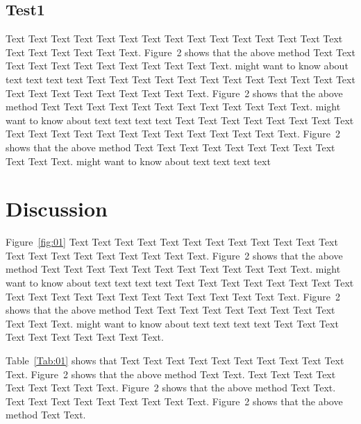 \documentclass{bioinfo}
\begin{document}
\subsection{Test1}

Text Text Text Text Text Text  Text Text Text Text Text Text Text
Text Text  Text Text Text Text Text Text.
Figure~2\vphantom{\ref{fig:02}} shows that the above method  Text
Text Text Text  Text Text Text Text Text Text  Text Text.
\citealp{Boffelli03} might want to know about  text text text text
Text Text Text Text Text Text  Text Text Text Text Text Text Text
Text Text  Text Text Text Text Text Text.
Figure~2\vphantom{\ref{fig:02}} shows that the above method  Text
Text Text Text  Text Text Text Text Text Text  Text Text.
\citealp{Boffelli03} might want to know about  text text text text
Text Text Text Text Text Text Text Text Text Text Text Text Text
Text Text  Text Text Text Text Text Text.
Figure~2\vphantom{\ref{fig:02}} shows that the above method  Text
Text Text Text  Text Text Text Text Text Text  Text Text.
\citealp{Boffelli03} might want to know about  text text text text





\section{Discussion}

Figure~\ref{fig:01}
Text Text Text Text Text Text  Text Text Text Text Text Text Text
Text Text  Text Text Text Text Text Text.
Figure~2\vphantom{\ref{fig:02}} shows that the above method  Text
Text Text Text  Text Text Text Text Text Text  Text Text.
\citealp{Boffelli03} might want to know about  text text text text
Text Text Text Text Text Text  Text Text Text Text Text Text Text
Text Text  Text Text Text Text Text Text.
Figure~2\vphantom{\ref{fig:02}} shows that the above method  Text
Text Text Text  Text Text Text Text Text Text  Text Text.
\citealp{Boffelli03} might want to know about  text text text text
Text Text Text Text Text Text Text Text Text Text.




Table~\ref{Tab:01} shows that Text Text Text Text Text  Text Text
Text Text Text Text. Figure~2\vphantom{\ref{fig:02}} shows that
the above method Text Text. Text Text Text  Text Text Text Text
Text Text. Figure~2\vphantom{\ref{fig:02}} shows that the above
method Text Text. Text Text Text  Text Text Text Text Text Text.
Figure~2\vphantom{\ref{fig:02}} shows that the above method Text
Text.
\end{document}

